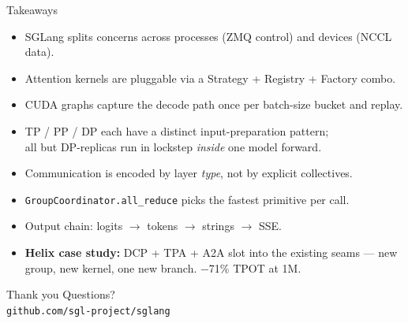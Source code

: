 \documentclass[aspectratio=169,10pt]{beamer}
\begin{document}
\begin{frame}{Takeaways}
  \begin{itemize}
    \item SGLang splits concerns across processes (ZMQ control) and devices (NCCL data).
    \item Attention kernels are pluggable via a Strategy + Registry + Factory combo.
    \item CUDA graphs capture the decode path once per batch-size bucket and replay.
    \item TP / PP / DP each have a distinct input-preparation pattern;\\
          all but DP-replicas run in lockstep \emph{inside} one model forward.
    \item Communication is encoded by layer \emph{type}, not by explicit collectives.
    \item \texttt{GroupCoordinator.all\_reduce} picks the fastest primitive per call.
    \item Output chain: logits $\to$ tokens $\to$ strings $\to$ SSE.
    \item \textbf{Helix case study:} DCP + TPA + A2A slot into the existing seams --- new group, new kernel, one new branch. −71\% TPOT at 1M.
  \end{itemize}
\end{frame}

\begin{frame}{Thank you}
  \centering
  \vspace{1.5cm}
  \Large Questions?\\[1cm]
  \normalsize \texttt{github.com/sgl-project/sglang}
\end{frame}
\end{document}
